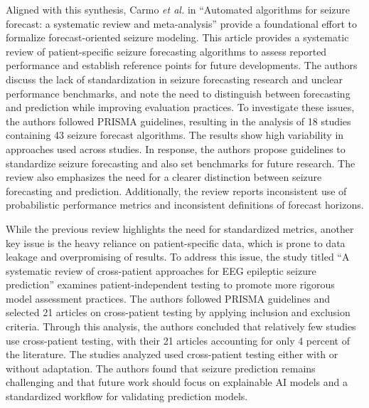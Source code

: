 \documentclass[conference]{IEEEtran}
\begin{document}
Aligned with this synthesis, Carmo \textit{et al.} in ``Automated algorithms for seizure forecast: a systematic review and meta-analysis'' \cite{carmo2024seizureforecast} provide a foundational effort to formalize forecast-oriented seizure modeling. This article provides a systematic review of patient-specific seizure forecasting algorithms to assess reported performance and establish reference points for future developments. The authors discuss the lack of standardization in seizure forecasting research and unclear performance benchmarks, and note the need to distinguish between forecasting and prediction while improving evaluation practices. To investigate these issues, the authors followed PRISMA guidelines, resulting in the analysis of 18 studies containing 43 seizure forecast algorithms. The results show high variability in approaches used across studies. In response, the authors propose guidelines to standardize seizure forecasting and also set benchmarks for future research. The review also emphasizes the need for a clearer distinction between seizure forecasting and prediction. Additionally, the review reports inconsistent use of probabilistic performance metrics and inconsistent definitions of forecast horizons.

While the previous review highlights the need for standardized metrics, another key issue is the heavy reliance on patient-specific data, which is prone to data leakage and overpromising of results. To address this issue, the study titled “A systematic review of cross-patient approaches for EEG epileptic seizure prediction” \cite{shafiezadeh2024crosspatient} examines patient-independent testing to promote more rigorous model assessment practices. The authors followed PRISMA guidelines and selected 21 articles on cross-patient testing by applying inclusion and exclusion criteria. Through this analysis, the authors concluded that relatively few studies use cross-patient testing, with their 21 articles accounting for only 4 percent of the literature. The studies analyzed used cross-patient testing either with or without adaptation. The authors found that seizure prediction remains challenging and that future work should focus on explainable AI models and a standardized workflow for validating prediction models.
\end{document}
